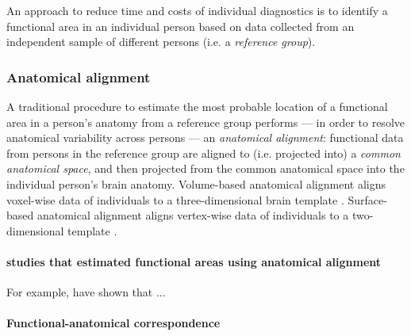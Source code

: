 An approach to reduce time and costs of individual diagnostics is to identify a
functional area in an individual person based on data collected from an
independent sample of different persons (i.e. a \textit{reference group}).



\subsubsection{Anatomical alignment}

%
A traditional procedure \citep{frost2012measuring, weiner2018defining,
zhen2017quantifying, zhen2015quantifying, rosenke2021probabilistic,
wang2015probabilistic} to estimate the most probable location of a functional
area in a person's anatomy from a reference group performs --- in order to
resolve anatomical variability across persons --- an \textit{anatomical
alignment}:
%
functional data from persons in the reference group are aligned to (i.e.
projected into) a \textit{common anatomical space}, and then projected from the
common anatomical space into the individual person's brain anatomy.
Volume-based anatomical alignment \citep[s.][for a review]{klein2009evaluation}
aligns voxel-wise data of individuals to a three-dimensional brain template
\citep[e.g., MNI152 template;][]{fonov2011unbiased}.
Surface-based anatomical alignment \citep{fischl1999cortical} aligns vertex-wise
data of individuals to a two-dimensional template \citep[e.g., FreeSurfer
fsaverage template;][]{fischl1999high}.


\paragraph{studies that estimated functional areas using anatomical alignment}



For example, \citep{frost2012measuring, weiner2018defining,
zhen2017quantifying, zhen2015quantifying, rosenke2021probabilistic,
wang2015probabilistic} have shown that ...


\paragraph{Functional-anatomical correspondence}

